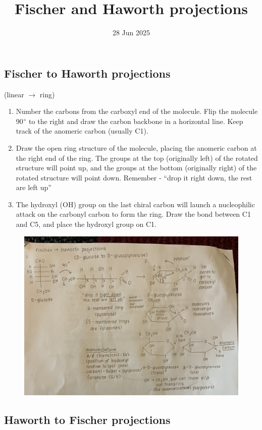 \documentclass[letterpaper, 12pt]{article}
\title{Fischer and Haworth projections}
\date{28 Jun 2025}
\begin{document}
\maketitle

\subsection*{Fischer to Haworth projections}
(linear $\to$ ring)

\begin{enumerate}
\item Number the carbons from the carboxyl end of the molecule. Flip the molecule 90$\degree$ to the right and draw the carbon backbone in a horizontal line. Keep track of the anomeric carbon (usually C1).
\item Draw the open ring structure of the molecule, placing the anomeric carbon at the right end of the ring. The groups at the top (originally left) of the rotated structure will point up, and the groups at the bottom (originally right) of the rotated structure will point down. Remember - ``drop it right down, the rest are left up''
\item The hydroxyl (OH) group on the last chiral carbon will launch a nucleophilic attack on the carbonyl carbon to form the ring. Draw the bond between C1 and C5, and place the hydroxyl group on C1.
\end{enumerate}

\begin{figure}[H]
\centering
\includegraphics[width=\textwidth]{fth}
\end{figure}

\subsection*{Haworth to Fischer projections}
\end{document}
